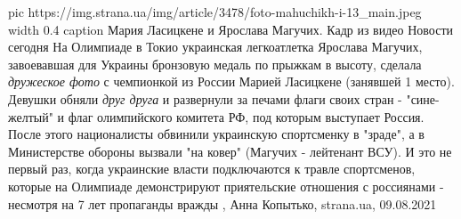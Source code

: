 \ifcmt
  pic https://img.strana.ua/img/article/3478/foto-mahuchikh-i-13_main.jpeg
  width 0.4
	caption Мария Ласицкене и Ярослава Магучих. Кадр из видео Новости сегодня 
\fi
На Олимпиаде в Токио украинская легкоатлетка Ярослава Магучих, завоевавшая для
Украины бронзовую медаль по прыжкам в высоту, сделала \emph{дружеское фото} с
чемпионкой из России Марией Ласицкене (занявшей 1 место).
Девушки обняли \emph{друг друга} и развернули за печами флаги своих стран -
"сине-желтый" и флаг олимпийского комитета РФ, под которым выступает Россия.
После этого националисты обвинили украинскую спортсменку в "зраде", а в
Министерстве обороны вызвали "на ковер" (Магучих - лейтенант ВСУ). И это не
первый раз, когда украинские власти подключаются к травле спортсменов, которые
на Олимпиаде демонстрируют приятельские отношения с россиянами - несмотря на 7
лет пропаганды вражды
, 
Анна Копытько, strana.ua, 09.08.2021

